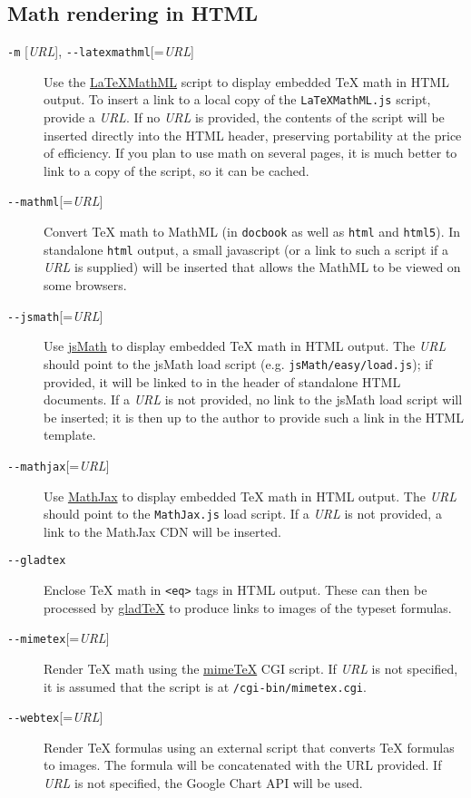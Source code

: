 \documentclass[]{article}
\begin{document}
\subsection{Math rendering in HTML}

\begin{description}
\item[\texttt{-m} {[}\emph{URL}{]},
\texttt{-{}-latexmathml}{[}=\emph{URL}{]}]
Use the \href{http://math.etsu.edu/LaTeXMathML/}{LaTeXMathML} script to
display embedded TeX math in HTML output. To insert a link to a local
copy of the \texttt{LaTeXMathML.js} script, provide a \emph{URL}. If no
\emph{URL} is provided, the contents of the script will be inserted
directly into the HTML header, preserving portability at the price of
efficiency. If you plan to use math on several pages, it is much better
to link to a copy of the script, so it can be cached.
\item[\texttt{-{}-mathml}{[}=\emph{URL}{]}]
Convert TeX math to MathML (in \texttt{docbook} as well as \texttt{html}
and \texttt{html5}). In standalone \texttt{html} output, a small
javascript (or a link to such a script if a \emph{URL} is supplied) will
be inserted that allows the MathML to be viewed on some browsers.
\item[\texttt{-{}-jsmath}{[}=\emph{URL}{]}]
Use \href{http://www.math.union.edu/~dpvc/jsmath/}{jsMath} to display
embedded TeX math in HTML output. The \emph{URL} should point to the
jsMath load script (e.g. \texttt{jsMath/easy/load.js}); if provided, it
will be linked to in the header of standalone HTML documents. If a
\emph{URL} is not provided, no link to the jsMath load script will be
inserted; it is then up to the author to provide such a link in the HTML
template.
\item[\texttt{-{}-mathjax}{[}=\emph{URL}{]}]
Use \href{http://www.mathjax.org/}{MathJax} to display embedded TeX math
in HTML output. The \emph{URL} should point to the \texttt{MathJax.js}
load script. If a \emph{URL} is not provided, a link to the MathJax CDN
will be inserted.
\item[\texttt{-{}-gladtex}]
Enclose TeX math in \texttt{\textless{}eq\textgreater{}} tags in HTML
output. These can then be processed by
\href{http://ans.hsh.no/home/mgg/gladtex/}{gladTeX} to produce links to
images of the typeset formulas.
\item[\texttt{-{}-mimetex}{[}=\emph{URL}{]}]
Render TeX math using the
\href{http://www.forkosh.com/mimetex.html}{mimeTeX} CGI script. If
\emph{URL} is not specified, it is assumed that the script is at
\texttt{/cgi-bin/mimetex.cgi}.
\item[\texttt{-{}-webtex}{[}=\emph{URL}{]}]
Render TeX formulas using an external script that converts TeX formulas
to images. The formula will be concatenated with the URL provided. If
\emph{URL} is not specified, the Google Chart API will be used.
\end{description}
\end{document}
